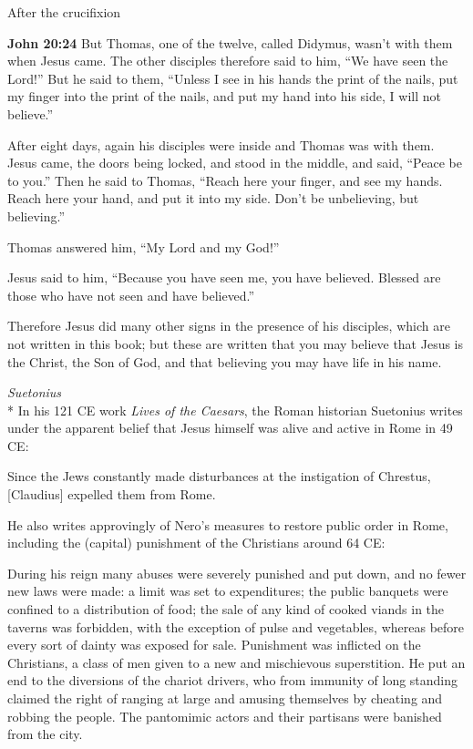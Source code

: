 \documentclass[10pt,twoside]{article} %
\newcommand{\doimage}[2]{\texttt{[image: \#2]}\label{fig:#2}}
\newcommand{\figbasic}[4]{ %
    \ifthenelse{\isodd{\pageref{fig:#2}}}{}{\hfill}
    \ifstrempty{#3}{
      \doimage{#1}{#2}
    }{
      \makebox{\doimage{#1}{#2} \\ #3}
    }
    \ifthenelse{\isodd{\pageref{fig:#2}}}{\hfill}{}
    \par
}
\newcommand{\fig}[2][0.4]{
  \figbasic{#1}{#2}{}{}
}
\newcommand{\quotesize}{\normalsize{}}
\newcommand{\comm}[1]{\begingroup \color{black!50} #1\endgroup}
\newenvironment{quotetext}{\begingroup\quotesize}{\endgroup}
\newcommand{\intex}[1]{\index[texts]{#1}}
\newcommand{\bible}[2]{\begin{quotetext}\textbf{#1}\intex{#1} #2\end{quotetext}}
\newcommand{\john}[2]{\bible{John #1}{#2}}
\newcommand{\subhead}[1]{\emph{#1}\\*}
\begin{document}
\begin{section}{After the crucifixion}
\fig[0.6]{doubting-thomas}

\john{20:24}{
  But Thomas, one of the twelve, called Didymus, wasn't with them when Jesus came.   The other disciples therefore said to him, ``We have seen the Lord!''
But he said to them, ``Unless I see in his hands the print of the nails, put my finger into the print of the nails, and put my hand into his side, I will not believe.''

  After eight days, again his disciples were inside and Thomas was with them. Jesus came, the doors being locked, and stood in the middle, and said, ``Peace be to you.''   Then he said to Thomas, ``Reach here your finger, and see my hands. Reach here your hand, and put it into my side. Don't be unbelieving, but believing.''

  Thomas answered him, ``My Lord and my God!''

  Jesus said to him, ``Because you have seen me, you have believed. Blessed are those who have not seen and have believed.''

  Therefore Jesus did many other signs in the presence of his disciples, which are not written in this book;   but these are written that you may believe that Jesus is the Christ, the Son of God, and that believing you may have life in his name. 
}

\subhead{Suetonius}
\comm{In his 121 CE work \emph{Lives of the Caesars}, the Roman historian Suetonius writes under the apparent
belief that Jesus himself was alive and active in Rome in 49 CE:}

\begin{quotetext}
Since the Jews constantly made disturbances at the instigation of Chrestus, [Claudius] expelled them from Rome.
\end{quotetext}

\comm{He also writes approvingly of Nero's measures to
restore public order in Rome, including the (capital) punishment of the Christians around 64 CE:}

\begin{quotetext}
During his reign many abuses were severely punished and put down, and
no fewer new laws were made: a limit was set to expenditures; the
public banquets were confined to a distribution of food; the sale of
any kind of cooked viands in the taverns was forbidden, with the
exception of pulse and vegetables, whereas before every sort of dainty
was exposed for sale. Punishment was inflicted on the Christians, a
class of men given to a new and mischievous superstition. He put an
end to the diversions of the chariot drivers, who from immunity of
long standing claimed the right of ranging at large and amusing
themselves by cheating and robbing the people. The pantomimic actors
and their partisans were banished from the city.
\end{quotetext}


\end{section}
\end{document}
